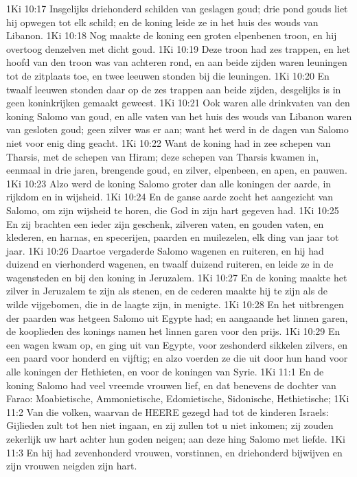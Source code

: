 1Ki 10:17  Insgelijks driehonderd schilden van geslagen goud; drie pond gouds liet hij opwegen tot elk schild; en de koning leide ze in het huis des wouds van Libanon.
1Ki 10:18  Nog maakte de koning een groten elpenbenen troon, en hij overtoog denzelven met dicht goud.
1Ki 10:19  Deze troon had zes trappen, en het hoofd van den troon was van achteren rond, en aan beide zijden waren leuningen tot de zitplaats toe, en twee leeuwen stonden bij die leuningen.
1Ki 10:20  En twaalf leeuwen stonden daar op de zes trappen aan beide zijden, desgelijks is in geen koninkrijken gemaakt geweest.
1Ki 10:21  Ook waren alle drinkvaten van den koning Salomo van goud, en alle vaten van het huis des wouds van Libanon waren van gesloten goud; geen zilver was er aan; want het werd in de dagen van Salomo niet voor enig ding geacht.
1Ki 10:22  Want de koning had in zee schepen van Tharsis, met de schepen van Hiram; deze schepen van Tharsis kwamen in, eenmaal in drie jaren, brengende goud, en zilver, elpenbeen, en apen, en pauwen.
1Ki 10:23  Alzo werd de koning Salomo groter dan alle koningen der aarde, in rijkdom en in wijsheid.
1Ki 10:24  En de ganse aarde zocht het aangezicht van Salomo, om zijn wijsheid te horen, die God in zijn hart gegeven had.
1Ki 10:25  En zij brachten een ieder zijn geschenk, zilveren vaten, en gouden vaten, en klederen, en harnas, en specerijen, paarden en muilezelen, elk ding van jaar tot jaar.
1Ki 10:26  Daartoe vergaderde Salomo wagenen en ruiteren, en hij had duizend en vierhonderd wagenen, en twaalf duizend ruiteren, en leide ze in de wagensteden en bij den koning in Jeruzalem.
1Ki 10:27  En de koning maakte het zilver in Jeruzalem te zijn als stenen, en de cederen maakte hij te zijn als de wilde vijgebomen, die in de laagte zijn, in menigte.
1Ki 10:28  En het uitbrengen der paarden was hetgeen Salomo uit Egypte had; en aangaande het linnen garen, de kooplieden des konings namen het linnen garen voor den prijs.
1Ki 10:29  En een wagen kwam op, en ging uit van Egypte, voor zeshonderd sikkelen zilvers, en een paard voor honderd en vijftig; en alzo voerden ze die uit door hun hand voor alle koningen der Hethieten, en voor de koningen van Syrie.
1Ki 11:1  En de koning Salomo had veel vreemde vrouwen lief, en dat benevens de dochter van Farao: Moabietische, Ammonietische, Edomietische, Sidonische, Hethietische;
1Ki 11:2  Van die volken, waarvan de HEERE gezegd had tot de kinderen Israels: Gijlieden zult tot hen niet ingaan, en zij zullen tot u niet inkomen; zij zouden zekerlijk uw hart achter hun goden neigen; aan deze hing Salomo met liefde.
1Ki 11:3  En hij had zevenhonderd vrouwen, vorstinnen, en driehonderd bijwijven en zijn vrouwen neigden zijn hart.
